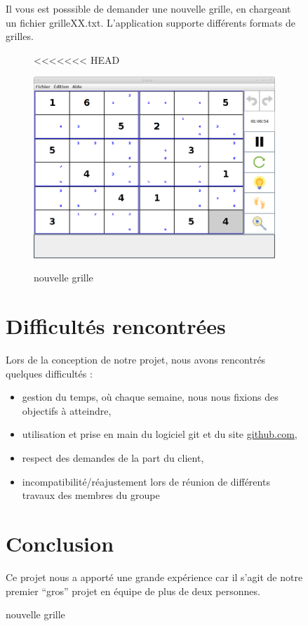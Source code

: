 \begin{figure}[ht]
\newpage
Il vous est posssible de demander une nouvelle grille, en chargeant 
un fichier grilleXX.txt. L'application supporte différents formats de grilles. 
\begin{figure}[ht]
<<<<<<< HEAD
  \caption{\label{annexe15} nouvelle grille}
  \includegraphics [width=130mm]{images/newGrid.png} \\[0.5cm]
\end{figure}

\newpage
\section{Difficultés rencontrées}
Lors de la conception de notre projet, nous avons rencontrés quelques difficultés :
\begin{itemize}
 \item gestion du temps, où chaque semaine, nous nous fixions des objectifs à atteindre,
 \item utilisation et prise en main du logiciel git et du site 
	    \href{https://github.com/yuki1996/Sudoku}{github.com}, 
 \item respect des demandes de la part du client, 
 \item incompatibilité/réajustement lors de réunion de différents travaux des membres du groupe
\end{itemize}


\section{Conclusion}
Ce projet nous a apporté une grande expérience car il s'agit 
de notre premier ``gros'' projet en équipe de plus de deux personnes.


\end{figure}
